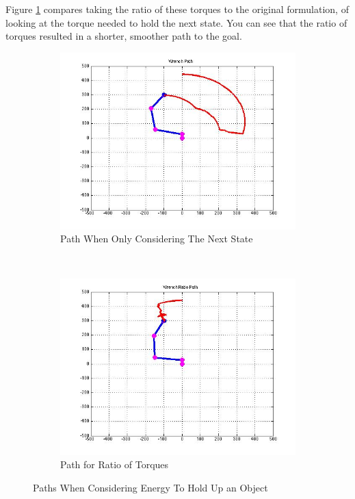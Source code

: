 \documentclass{article}
\begin{document}
Figure \ref{fig:EnergyPaths2} compares taking the ratio of these torques to the original formulation, of looking at the torque needed to hold the next state. You can see that the ratio of torques resulted in a shorter, smoother path to the goal.\\
\begin{figure}[htb]
\centering
\begin{subfigure}[b]{0.5\textwidth}
\centering
\includegraphics[scale=.3]{PathPics/Wrench_Path.jpg}
\caption{Path When Only Considering The Next State}
\end{subfigure}%
~ 
\begin{subfigure}[b]{0.5\textwidth}
\centering
\includegraphics[scale=.3]{PathPics/Wrench_Ratio_Path.jpg}
\caption{Path for Ratio of Torques}
\end{subfigure}

\caption{Paths When Considering Energy To Hold Up an Object}
\label{fig:EnergyPaths2}
\end{figure}\\
\end{document}
